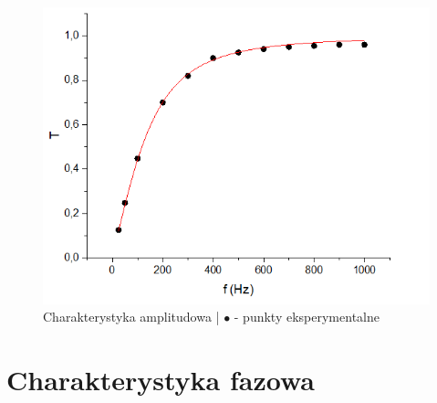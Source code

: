 \begin{itemize}
\begin{figure}[H]
            \includegraphics[scale=0.7]{img_wykresy/amplitudowa_CR.png}
            \caption{Charakterystyka amplitudowa | $\bullet$ - punkty eksperymentalne}
            \label{fig:CR_amp}
        \end{figure}
    \end{itemize}

\section{Charakterystyka fazowa}

